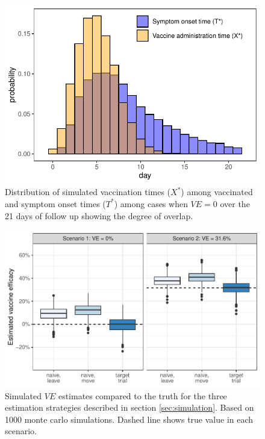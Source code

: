 \begin{appendix}
    \begin{figure}[p]
        \centering
        \includegraphics{../../../../3_figures/dist.pdf}
        \caption{Distribution of simulated vaccination times ($X^*$) among vaccinated and symptom onset times ($T^*$) among cases when $VE = 0$ over the 21 days of follow up showing the degree of overlap.}
        \label{fig:example_overlap_appendix}
    \end{figure}

    \clearpage 

    \begin{figure}[p]
        \centering
        \includegraphics{../../../../3_figures/sim_rr.pdf}
        \caption{Simulated $VE$ estimates compared to the truth for the three estimation strategies described in section \ref{sec:simulation}. Based on 1000 monte carlo simulations. Dashed line shows true value in each scenario. \label{fig:sim_results_appendix}}
    \end{figure}


\end{appendix}
